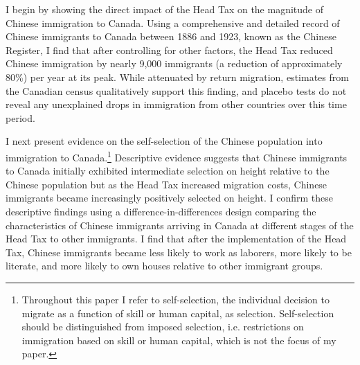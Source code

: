 I begin by showing the direct impact of the Head Tax on the magnitude of Chinese immigration to Canada. Using a comprehensive and detailed record of Chinese immigrants to Canada between 1886 and 1923, known as the Chinese Register, I find that after controlling for other factors, the Head Tax reduced Chinese immigration by nearly 9,000 immigrants (a reduction of approximately 80\%) per year at its peak. While attenuated by return migration, estimates from the Canadian census qualitatively support this finding, and placebo tests do not reveal any unexplained drops in immigration from other countries over this time period.

I next present evidence on the self-selection of the Chinese population into immigration to Canada.\footnote{Throughout this paper I refer to self-selection, the individual decision to migrate as a function of skill or human capital, as selection. Self-selection should be distinguished from imposed selection, i.e. restrictions on immigration based on skill or human capital, which is not the focus of my paper.} 
Descriptive evidence suggests that Chinese immigrants to Canada initially exhibited intermediate selection on height relative to the Chinese population but as the Head Tax increased migration costs, Chinese immigrants became increasingly positively selected on height. I confirm these descriptive findings using a difference-in-differences design comparing the characteristics of Chinese immigrants arriving in Canada at different stages of the Head Tax to other immigrants. I find that after the implementation of the Head Tax, Chinese immigrants became less likely to work as laborers, more likely to be literate, and more likely to own houses relative to other immigrant groups.  




